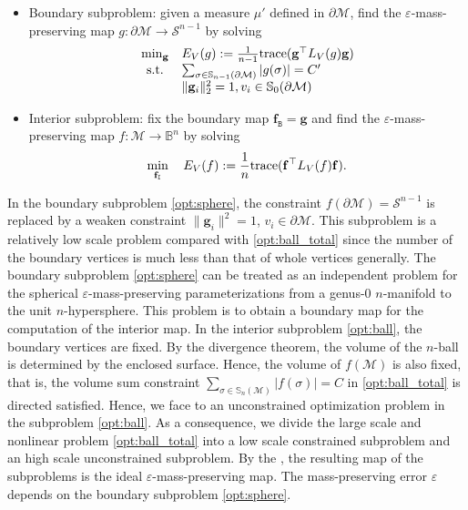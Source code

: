 \documentclass{article}
\begin{document}
\begin{itemize}
    \item[1)] Boundary subproblem: given a measure $\mu'$ defined in $\partial \mathcal{M}$, find the $\varepsilon$-mass-preserving map $g:\partial \mathcal{M} \to \mathcal{S}^{n-1}$ by solving
\begin{align} \label{opt:sphere}
\begin{array}{l@{}c@{\quad}l}
    & \min_\mathbf{g} & E_V(g):=\frac{1}{n-1} \trace(\mathbf{g}^\top L_V(g) \mathbf{g})\\
    & \text{s.t.} & \sum_{\sigma\in \mathbb{S}_{n-1}(\partial \mathcal{M})} |g(\sigma)| = C'\\
    && \|\mathbf{g}_i\|_2^2 = 1, v_i\in \mathbb{S}_0(\partial \mathcal{M})
\end{array}
\end{align}
    \item[2)] Interior subproblem: fix the boundary map $\mathbf{f}_\mathtt{B} = \mathbf{g}$ and find the $\varepsilon$-mass-preserving map $f:\mathcal{M} \to \mathbb{B}^n$ by solving
\begin{align} \label{opt:ball}
    \min_{\mathbf{f}_\mathtt{I}} \quad E_V(f):=\frac{1}{n} \mathrm{trace}(\mathbf{f}^\top L_V(f) \mathbf{f}).
\end{align}
\end{itemize}

In the boundary subproblem \eqref{opt:sphere}, the constraint $f(\partial \mathcal{M}) = \mathcal{S}^{n-1}$ is replaced by a weaken constraint $\|\mathbf{g}_i\|^2 = 1$, $v_i \in \partial \mathcal{M}$. This subproblem is a relatively low scale problem compared with \eqref{opt:ball_total} since the number of the boundary vertices is much less than that of whole vertices generally. The boundary subproblem \eqref{opt:sphere} can be treated as an independent problem for the spherical $\varepsilon$-mass-preserving parameterizations from a genus-$0$ $n$-manifold to the unit $n$-hypersphere. This problem is to obtain a boundary map for the computation of the interior map. In the interior subproblem \eqref{opt:ball}, the boundary vertices are fixed. By the divergence theorem, the volume of the $n$-ball is determined by the enclosed surface. Hence, the volume of $f(\mathcal{M})$ is also fixed, that is, the volume sum constraint $\sum_{\sigma\in \mathbb{S}_n(\mathcal{M})} |f(\sigma)| = C$ in \eqref{opt:ball_total} is directed satisfied. Hence, we face to an unconstrained optimization problem in the subproblem \eqref{opt:ball}. As a consequence, we
divide the large scale and nonlinear problem \eqref{opt:ball_total} into a low scale constrained subproblem and an high scale unconstrained subproblem. By the , the resulting map of the subproblems is the ideal $\varepsilon$-mass-preserving map. The mass-preserving error $\varepsilon$ depends on the boundary subproblem \eqref{opt:sphere}.
\end{document}
